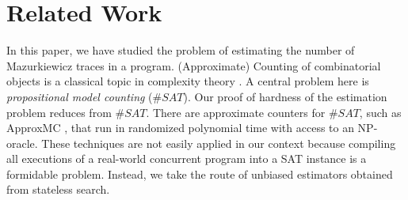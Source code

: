 \documentclass[acmsmall]{acmart}
\newcommand{\testor}{\textsc{TeStor}\xspace}
\begin{document}


%


\section{Related Work}

In this paper, we have studied the problem of estimating the number of Mazurkiewicz traces in a program. 
(Approximate) Counting of combinatorial objects is a classical topic in complexity theory \cite{Valiant79,JerrumVV86}.
A central problem here is \emph{propositional model counting} ($\#SAT$).
Our proof of hardness of the estimation problem reduces from $\#SAT$.
There are approximate counters for $\#SAT$, such as ApproxMC \cite{chakraborty2013scalableapproximatemodelcounter}, that run in randomized polynomial time with access to
an NP-oracle.
These techniques are not easily applied in our context because compiling all executions of a real-world concurrent program into a SAT instance is a formidable problem.
Instead, we take the route of unbiased estimators obtained from stateless search.
\end{document}
